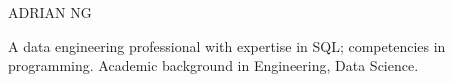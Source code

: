 \documentclass[10pt,a4paper]{altacv}
\begin{document}
\tagline{}

%

\begin{fullwidth}
\namefont\color{name}\MakeUppercase{Adrian Ng}\par
\end{fullwidth}

%



\small{A data engineering professional with expertise in SQL; competencies in programming. Academic background in Engineering, Data Science.}


\end{document}
